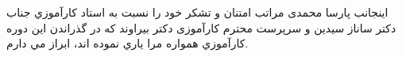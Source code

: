 \begin{acknowledgementpage}

\vspace{1.5cm}

{\nastaliq
{
اينجانب پارسا محمدی مراتب امتنان و تشكر خود را نسبت به استاد كارآموزي جناب دكتر ساناز سیدین و سرپرست محترم کارآموزی دکتر بیراوند كه در گذراندن اين دوره كارآموزي همواره مرا ياري نموده اند، ابراز مي دارم.
}}\end{acknowledgementpage}
\newpage